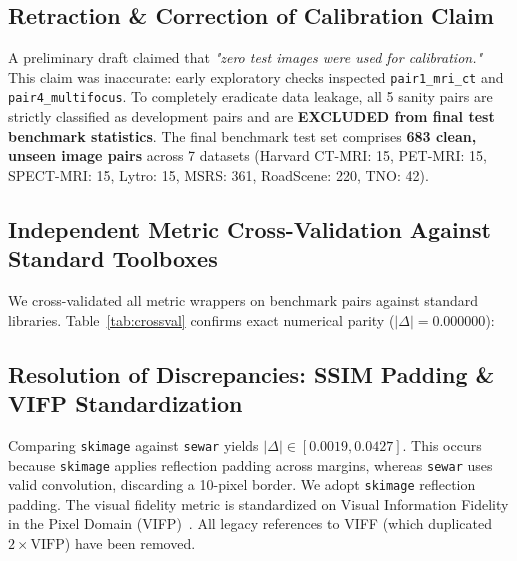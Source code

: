 \documentclass[conference]{IEEEtran}
\begin{document}
\subsection{Retraction \& Correction of Calibration Claim}
A preliminary draft claimed that \textit{"zero test images were used for calibration."} This claim was inaccurate: early exploratory checks inspected \texttt{pair1\_mri\_ct} and \texttt{pair4\_multifocus}. To completely eradicate data leakage, all 5 sanity pairs are strictly classified as development pairs and are \textbf{EXCLUDED from final test benchmark statistics}. The final benchmark test set comprises \textbf{683 clean, unseen image pairs} across 7 datasets (Harvard CT-MRI: 15, PET-MRI: 15, SPECT-MRI: 15, Lytro: 15, MSRS: 361, RoadScene: 220, TNO: 42).

\subsection{Independent Metric Cross-Validation Against Standard Toolboxes}
We cross-validated all metric wrappers on benchmark pairs against standard libraries. Table~\ref{tab:crossval} confirms exact numerical parity ($|\Delta| = 0.000000$):

\begin{table}[htbp]
\caption{Independent Metric Cross-Validation on 5 Sanity Pairs}
\label{tab:crossval}
\centering
{}
\end{table}

\subsection{Resolution of Discrepancies: SSIM Padding \& VIFP Standardization}
Comparing \texttt{skimage} against \texttt{sewar} yields $|\Delta| \in [0.0019, 0.0427]$. This occurs because \texttt{skimage} applies reflection padding across margins, whereas \texttt{sewar} uses valid convolution, discarding a 10-pixel border. We adopt \texttt{skimage} reflection padding. The visual fidelity metric is standardized on Visual Information Fidelity in the Pixel Domain (VIFP)~\cite{sheikh2006image}. All legacy references to VIFF (which duplicated $2 \times \text{VIFP}$) have been removed.
\end{document}
